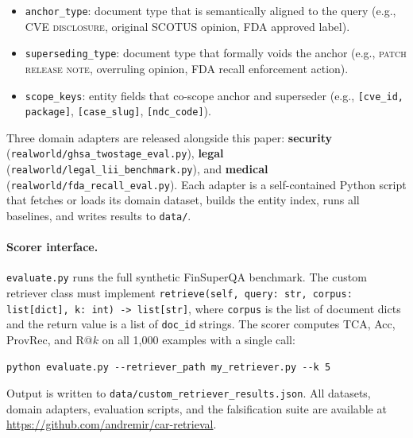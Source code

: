 \documentclass[11pt]{article}
\begin{document}
\begin{itemize}[noitemsep]
  \item \texttt{anchor\_type}: document type that is semantically aligned to the query (e.g., \textsc{CVE disclosure}, original SCOTUS opinion, FDA approved label).
  \item \texttt{superseding\_type}: document type that formally voids the anchor (e.g., \textsc{patch release note}, overruling opinion, FDA recall enforcement action).
  \item \texttt{scope\_keys}: entity fields that co-scope anchor and superseder (e.g., \texttt{[cve\_id, package]}, \texttt{[case\_slug]}, \texttt{[ndc\_code]}).
\end{itemize}

Three domain adapters are released alongside this paper: \textbf{security} (\texttt{realworld/ghsa\_twostage\_eval.py}), \textbf{legal} (\texttt{realworld/legal\_lii\_benchmark.py}), and \textbf{medical} (\texttt{realworld/fda\_recall\_eval.py}). Each adapter is a self-contained Python script that fetches or loads its domain dataset, builds the entity index, runs all baselines, and writes results to \texttt{data/}.

\paragraph{Scorer interface.} \texttt{evaluate.py} runs the full synthetic FinSuperQA benchmark. The custom retriever class must implement \texttt{retrieve(self, query: str, corpus: list[dict], k: int) -> list[str]}, where \texttt{corpus} is the list of document dicts and the return value is a list of \texttt{doc\_id} strings. The scorer computes TCA, Acc, ProvRec, and R@$k$ on all 1,000 examples with a single call:

\begin{verbatim}
python evaluate.py --retriever_path my_retriever.py --k 5
\end{verbatim}

Output is written to \texttt{data/custom\_retriever\_results.json}. All datasets, domain adapters, evaluation scripts, and the falsification suite are available at \url{https://github.com/andremir/car-retrieval}.
\end{document}
